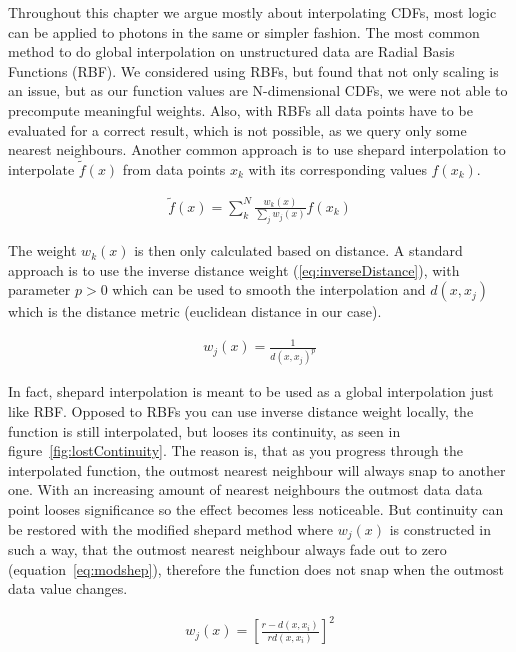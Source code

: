 Throughout this chapter we argue mostly about interpolating CDFs, most logic can be applied to photons in the same or simpler fashion. The most common method to do global interpolation on unstructured data are Radial Basis Functions (RBF). We considered using RBFs, but found that not only scaling is an issue, but as our function values are N-dimensional CDFs, we were not able to precompute meaningful weights. Also, with RBFs all data points have to be evaluated for a correct result, which is not possible, as we query only some nearest neighbours. Another common approach is to use shepard interpolation to interpolate $\widetilde{f}(x)$ from data points $x_k$ with its corresponding values $f(x_k)$. 

\begin{align}\label{eq:shepard}
\widetilde{f}(x) = \sum_{k}^{N}\frac{w_k(x)}{\sum\nolimits_{j}w_j(x)}f(x_k)
\end{align}

The weight $w_k(x)$ is then only calculated based on distance. A standard approach is to use the inverse distance weight (\ref{eq:inverseDistance}), with parameter $p > 0$ which can be used to smooth the interpolation and $d(x, x_j)$ which is the distance metric (euclidean distance in our case).

\begin{align}\label{eq:inverseDistance}
w_j(x) = \frac{1}{d(x, x_j)^p}
\end{align}

In fact, shepard interpolation is meant to be used as a global interpolation just like RBF. Opposed to RBFs you can use inverse distance weight locally, the function is still interpolated, but looses its continuity, as seen in figure~\ref{fig:lostContinuity}. The reason is, that as you progress through the interpolated function, the outmost nearest neighbour will always snap to another one. With an increasing amount of nearest neighbours the outmost data data point looses significance so the effect becomes less noticeable. But continuity can be restored with the modified shepard method  where $w_j(x)$ is constructed in such a way, that the outmost nearest neighbour always fade out to zero (equation~\ref{eq:modshep}), therefore the function does not snap when the outmost data value changes.

\begin{align}\label{eq:modshep}
w_j(x) = \left[ \frac{ r - d(x, x_i)}{ rd(x, x_i) } \right]^2
\end{align}

